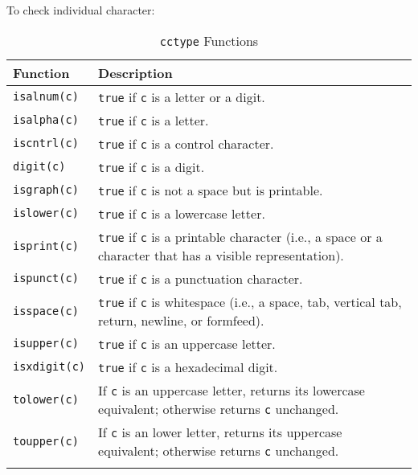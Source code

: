 To check individual character:

\begin{longtable}{p{.2\linewidth} p{.7\linewidth}} 
\toprule
Function & Description \\
\midrule
\endhead

\texttt{isalnum(c)}
& \texttt{true} if \texttt{c} is a letter or a digit.
\\

\texttt{isalpha(c)}
& \texttt{true} if \texttt{c} is a letter.
\\

\texttt{iscntrl(c)}
& \texttt{true} if \texttt{c} is a control character.
\\

\texttt{digit(c)}
& \texttt{true} if \texttt{c} is a digit.
\\

\texttt{isgraph(c)}
& \texttt{true} if \texttt{c} is not a space but is printable.
\\

\texttt{islower(c)}
& \texttt{true} if \texttt{c} is a lowercase letter.
\\

\texttt{isprint(c)}
& \texttt{true} if \texttt{c} is a printable character (i.e., a space or a character that has a visible representation).
\\

\texttt{ispunct(c)}
& \texttt{true} if \texttt{c} is a punctuation character.
\\

\texttt{isspace(c)}
& \texttt{true} if \texttt{c} is whitespace (i.e., a space, tab, vertical tab, return, newline, or formfeed).
\\

\texttt{isupper(c)}
& \texttt{true} if \texttt{c} is an uppercase letter.
\\

\texttt{isxdigit(c)}
& \texttt{true} if \texttt{c} is a hexadecimal digit.
\\

\texttt{tolower(c)}
& If \texttt{c} is an uppercase letter, returns its lowercase equivalent; otherwise returns \texttt{c} unchanged.
\\

\texttt{toupper(c)}
& If \texttt{c} is an lower letter, returns its uppercase equivalent; otherwise returns \texttt{c} unchanged.
\\

\midrule
\caption{\texttt{cctype} Functions} 
\label{tab:cctypefunctions}
\end{longtable}

